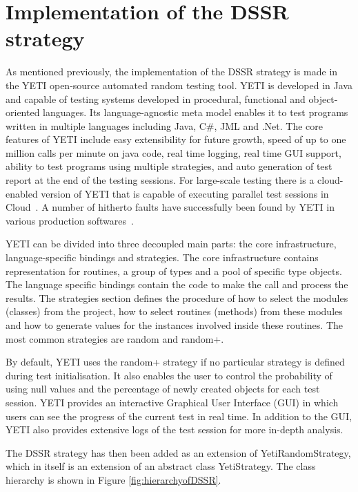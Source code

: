 \documentclass{acm_proc_article-sp}
\begin{document}
\section{Implementation of the DSSR \\ strategy}\label{sec:imp}
As mentioned previously, the implementation of the DSSR strategy is made in the YETI open-source automated random testing tool. YETI is developed in Java and capable of testing systems developed in procedural, functional and object-oriented languages. Its language-agnostic meta model enables it to test programs written in multiple languages including Java, C\#, JML and .Net. The core features of YETI include easy extensibility for future growth, speed of up to one million calls per minute on java code, real time logging, real time GUI support, ability to test programs using multiple strategies, and auto generation of test report at the end of the testing sessions. For large-scale testing there is a cloud-enabled version of YETI that is capable of executing parallel test sessions in Cloud~\cite{Oriol2010}. A number of hitherto faults have successfully been found by YETI in various production softwares~\cite{Oriol2012, Oriol2011}.

YETI can be divided into three decoupled main parts: the core infrastructure, language-specific bindings and strategies. The core infrastructure contains representation for routines, a group of types and a pool of specific type objects. The language specific bindings contain the code to make the call and process the results. The strategies section defines the procedure of how to select the modules (classes) from the project, how to select routines (methods) from these modules and how to generate values for the instances involved inside these routines. The most common strategies are random and random+. 

By default, YETI uses the random+ strategy if no particular strategy is defined during test initialisation. It also enables the user to control the probability of using null values and the percentage of newly created objects for each test session. YETI provides an interactive Graphical User Interface (GUI) in which users can see the progress of the current test in real time. In addition to the GUI, YETI also provides extensive logs of the test session for more in-depth analysis.

The DSSR strategy has then been added as an extension of YetiRandomStrategy, which in itself is an extension of an abstract class YetiStrategy. The class hierarchy is shown in Figure \ref{fig:hierarchyofDSSR}.
\end{document}
